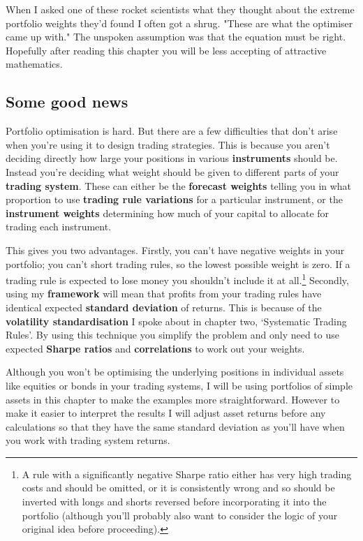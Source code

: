 When I asked one of these rocket scientists what they thought about the extreme portfolio weights they'd found I often got a shrug. "These are what the optimiser came up with." The unspoken assumption was that the equation must be right. Hopefully after reading this chapter you will be less accepting of attractive mathematics.

\subsection*{Some good news}

Portfolio optimisation is hard. But there are a few difficulties that don't arise when you're using it to design trading strategies. This is because you aren't deciding directly how large your positions in various \textbf{instruments} should be. Instead you're deciding what weight should be given to different parts of your \textbf{trading system}. These can either be the \textbf{forecast weights} telling you in what proportion to use \textbf{trading rule variations} for a particular instrument, or the \textbf{instrument weights} determining how much of your capital to allocate for trading each instrument.

This gives you two advantages. Firstly, you can't have negative weights in your portfolio; you can't short trading rules, so the lowest possible weight is zero. If a trading rule is expected to lose money you shouldn't include it at all.\footnote{A rule with a significantly negative Sharpe ratio either has very high trading costs and should be omitted, or it is consistently wrong and so should be inverted with longs and shorts reversed before incorporating it into the portfolio (although you'll probably also want to consider the logic of your original idea before proceeding).} Secondly, using my \textbf{framework} will mean that profits from your trading rules have identical expected \textbf{standard deviation} of returns. This is because of the \textbf{volatility standardisation} I spoke about in chapter two, ‘Systematic Trading Rules'. By using this technique you simplify the problem and only need to use expected \textbf{Sharpe ratios} and \textbf{correlations} to work out your weights.

Although you won't be optimising the underlying positions in individual assets like equities or bonds in your trading systems, I will be using portfolios of simple assets in this chapter to make the examples more straightforward. However to make it easier to interpret the results I will adjust asset returns before any calculations so that they have the same standard deviation as you'll have when you work with trading system returns.

